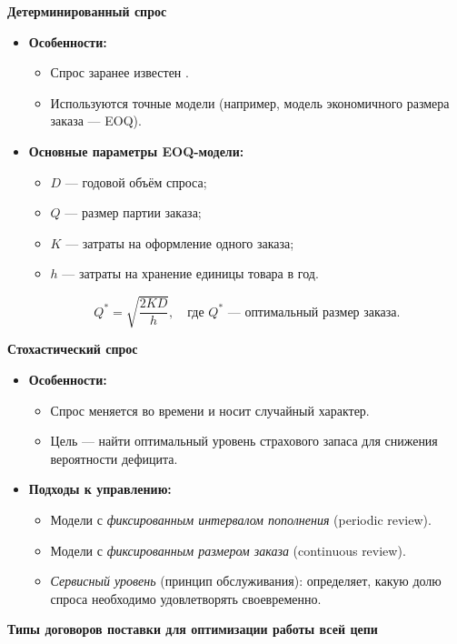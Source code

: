 \textbf{Детерминированный спрос}
\begin{itemize}
    \item \textbf{Особенности:}
    \begin{itemize}
        \item Спрос заранее известен    .
        \item Используются точные модели (например, модель экономичного размера заказа --- EOQ).
    \end{itemize}
    \item \textbf{Основные параметры EOQ-модели:}
    \begin{itemize}
        \item $D$ --- годовой объём спроса;
        \item $Q$ --- размер партии заказа;
        \item $K$ --- затраты на оформление одного заказа;
        \item $h$ --- затраты на хранение единицы товара в год.
    \end{itemize}
    \[
        Q^* = \sqrt{\frac{2KD}{h}}, 
        \quad 
        \text{где } Q^* \text{ --- оптимальный размер заказа.}
    \]
\end{itemize}

\textbf{Стохастический спрос}
\begin{itemize}
    \item \textbf{Особенности:}
    \begin{itemize}
        \item Спрос меняется во времени и носит случайный характер.
        \item Цель --- найти оптимальный уровень страхового запаса для снижения вероятности дефицита.
    \end{itemize}
    \item \textbf{Подходы к управлению:}
    \begin{itemize}
        \item Модели с \textit{фиксированным интервалом пополнения} (periodic review).
        \item Модели с \textit{фиксированным размером заказа} (continuous review).
        \item \textit{Сервисный уровень} (принцип обслуживания): определяет, какую долю спроса необходимо удовлетворять своевременно.
    \end{itemize}
\end{itemize}

\textbf{Типы договоров поставки для оптимизации работы всей цепи}

